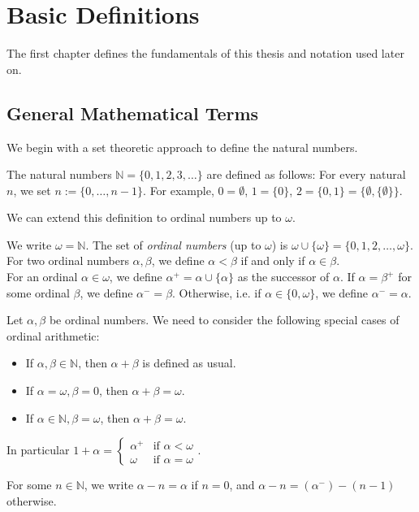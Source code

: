 \chapter{Basic Definitions}
The first chapter defines the fundamentals of this thesis and notation used later on.

\section{General Mathematical Terms}
We begin with a set theoretic approach to define the natural numbers.
\begin{defn}
	The natural numbers $\mathbb{N} = \{0, 1, 2, 3, \dots\}$ are defined as follows: For every natural $n$, we set $n := \{0, \dots, n-1\}$. For example, $0 = \emptyset$, $1 = \{0\}$, $2 = \{0, 1\} = \{\emptyset, \{\emptyset\}\}$.
\end{defn}

We can extend this definition to ordinal numbers up to $\omega$.

\begin{defn}
	We write $\omega = \mathbb{N}$. The set of \emph{ordinal numbers} (up to $\omega$) is $\omega \cup \{\omega\} = \{0, 1, 2, \dots, \omega\}$. For two ordinal numbers $\alpha, \beta$, we define $\alpha < \beta$ if and only if $\alpha \in \beta$. \\
	For an ordinal $\alpha \in \omega$, we define $\alpha^+ = \alpha \cup \{\alpha\}$ as the successor of $\alpha$. If $\alpha = \beta^+$ for some ordinal $\beta$, we define $\alpha^- = \beta$. Otherwise, i.e. if $\alpha \in \{0, \omega\}$, we define $\alpha^- = \alpha$.
\end{defn}

\begin{defn}
	Let $\alpha, \beta$ be ordinal numbers. We need to consider the following special cases of ordinal arithmetic:
	\begin{itemize}
		\item If $\alpha, \beta \in \mathbb{N}$, then $\alpha + \beta$ is defined as usual.
		\item If $\alpha = \omega, \beta = 0$, then $\alpha + \beta = \omega$.
		\item If $\alpha \in \mathbb{N}, \beta = \omega$, then $\alpha + \beta = \omega$.
	\end{itemize}
	In particular $1 + \alpha = \begin{cases}\alpha^+ & \text{if } \alpha < \omega \\ \omega & \text{if } \alpha = \omega\end{cases}$.
	
	For some $n \in \mathbb{N}$, we write $\alpha - n = \alpha$ if $n = 0$, and $\alpha - n = (\alpha^-) - (n-1)$ otherwise.
\end{defn}

